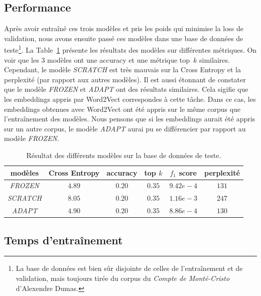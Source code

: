 \documentclass[a4paper]{article}
\begin{document}
\subsection{Performance}

Après avoir entraîné ces trois modèles et pris les poids qui minimise la loss de validation, nous avons ensuite passé ces modèles dans 
une base de données de teste\footnote{La base de données est bien sûr disjointe de celles de l'entraînement et de validation, mais toujours
tirée du corpus du \textit{Compte de Monté-Cristo} d'Alexendre Dumas.}. La Table~\ref{tab:test} présente les résultats des modèles sur 
différentes métriques. On voir que les 3 modèles ont une accuracy et une métrique top~$k$ similaires. Cependant, le modèle \textit{SCRATCH} 
est très mauvais sur la Cross Entropy et la perplexité (par rapport aux autres modèles). Il est aussi étonnant de constater que le modèle
\textit{FROZEN} et \textit{ADAPT} ont des résultats similaires. Cela sigifie que les embeddings appris par Word2Vect correspondes à cette tâche.
Dans ce cas, les embeddings obtenues avec Word2Vect ont été appris sur le même corpus que l'entraînement des modèles. Nous pensons que si 
les embeddings aurait été appris sur un autre corpus, le modèle \textit{ADAPT} aurai pu se différencier par rapport au modèle \textit{FROZEN}.


\begin{table}[ht]
    \centering
    \begin{tabular}{|c|c|c|c|c|c|}
        \hline
        modèles & Cross Entropy & accuracy & top $k$ & $f_1$ score & perplexité \\
        \hline
        \textit{FROZEN} & $4.89$ &  $0.20$ & $0.35$ & $9.42e-4$ & $131$ \\
        \textit{SCRATCH} & $8.05$ &  $0.20$ & $0.35$ & $1.16e-3$ & $247$ \\
        \textit{ADAPT} & $4.90$ &  $0.20$ & $0.35$ & $8.86e-4$ & $130$ \\
        \hline
    \end{tabular}
    \caption{Résultat des différents modèles sur la base de données de teste.}
    \label{tab:test}
\end{table}

\subsection{Temps d'entraînement}
\end{document}

